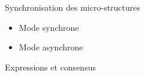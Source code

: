 \begin{block}{Synchronisation des micro-structures}
	\begin{itemize}
		\item Mode synchrone
		\item Mode asynchrone
	\end{itemize}
\end{block}
\begin{block}{Expressions et consensus}
\end{block}
